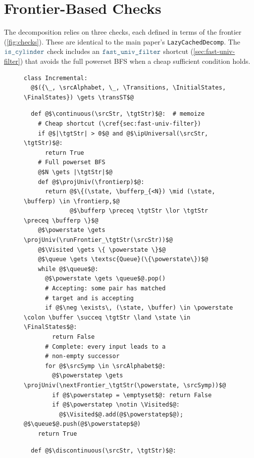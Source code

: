 \documentclass{article}
\theoremstyle{plain}
\newcommand{\mymacro}[1]{#1}
\newcommand{\srcSymp}{{\color{TokenColor}x^\prime}}
\newcommand{\srcStr}{\ensuremath{{\color{TokenColor}\boldsymbol{x}}}\xspace}
\newcommand{\tgtStr}{{\color{CharacterColor}\boldsymbol{y}}}
\newcommand{\srcAlphabet}[0]{{\color{TokenColor}\ensuremath{\mathcal{X}}}\xspace}
\newcommand{\transST}{{\color{CharacterColor}\texttt{f}}}
\newcommand{\Transitions}{\mymacro{\mathsf{T}}}
\newcommand{\InitialStates}[0]{\mymacro{\mathsf{I}}}
\newcommand{\FinalStates}{\mymacro{\mathsf{F}}}
\newcommand{\state}{\mymacro{s}}
\newcommand{\queue}[0]{\texttt{q}}
\newcommand{\frontier}{\mathcal{F}}
\newcommand{\frontierp}{\frontier^\prime}
\newcommand{\powerstate}{S}
\newcommand{\powerstatep}{\powerstate^{\prime}}
\newcommand{\buffer}{{\color{CharacterColor}\boldsymbol{b}}}
\newcommand{\bufferp}{{\color{CharacterColor}\boldsymbol{b}'}}
\newcommand{\myMintedFunc}[1]{\mbox{\texttt{{\color{StormBlue}#1}}}}
\newcommand{\continuous}[0]{\myMintedFunc{is\_cylinder}}
\newcommand{\discontinuous}[0]{\myMintedFunc{is\_member}}
\newcommand{\runFrontier}[0]{\myMintedFunc{run}}
\newcommand{\nextFrontier}[0]{\myMintedFunc{step}}
\newcommand{\ipUniversal}[0]{\myMintedFunc{fast\_univ\_filter}}
\newcommand{\projUniv}[0]{\myMintedFunc{proj\_pos}}
\newcommand{\Visited}{\mymacro{V}}
\begin{document}
\section{Frontier-Based Checks}
\label{sec:checks}

The decomposition relies on three checks, each defined in terms of the frontier
(\cref{fig:checks}).  These are identical to the main paper's
\texttt{LazyCachedDecomp}.
The $\continuous$ check includes an $\ipUniversal$ shortcut
(\cref{sec:fast-univ-filter}) that avoids the full powerset BFS when a cheap
sufficient condition holds.

\begin{figure}[H]
\centering
\begin{minipage}[t]{.58\linewidth}
\begin{verbatim}
class Incremental:
  @$({\_, \srcAlphabet, \_, \Transitions, \InitialStates, \FinalStates}) \gets \transST$@
\end{verbatim}
\begin{verbatim}
  def @$\continuous(\srcStr, \tgtStr)$@:  # memoize
    # Cheap shortcut (\cref{sec:fast-univ-filter})
    if @$|\tgtStr| > 0$@ and @$\ipUniversal(\srcStr, \tgtStr)$@:
      return True
    # Full powerset BFS
    @$N \gets |\tgtStr|$@
    def @$\projUniv(\frontierp)$@:
      return @$\{(\state, \bufferp_{<N}) \mid (\state, \bufferp) \in \frontierp,$@
             @$\bufferp \preceq \tgtStr \lor \tgtStr \preceq \bufferp \}$@
    @$\powerstate \gets \projUniv(\runFrontier_\tgtStr(\srcStr))$@
    @$\Visited \gets \{ \powerstate \}$@
    @$\queue \gets \textsc{Queue}(\{\powerstate\})$@
    while @$\queue$@:
      @$\powerstate \gets \queue$@.pop()
      # Accepting: some pair has matched
      # target and is accepting
      if @$\neg \exists\, (\state, \buffer) \in \powerstate \colon \buffer \succeq \tgtStr \land \state \in \FinalStates$@:
        return False
      # Complete: every input leads to a
      # non-empty successor
      for @$\srcSymp \in \srcAlphabet$@:
        @$\powerstatep \gets \projUniv(\nextFrontier_\tgtStr(\powerstate, \srcSymp))$@
        if @$\powerstatep = \emptyset$@: return False
        if @$\powerstatep \notin \Visited$@:
          @$\Visited$@.add(@$\powerstatep$@); @$\queue$@.push(@$\powerstatep$@)
    return True
\end{verbatim}
\end{minipage}
\hfill
\begin{minipage}[t]{.38\linewidth}
\begin{verbatim}
  def @$\discontinuous(\srcStr, \tgtStr)$@:

\end{verbatim}
\end{minipage}
\end{figure}
\end{document}

